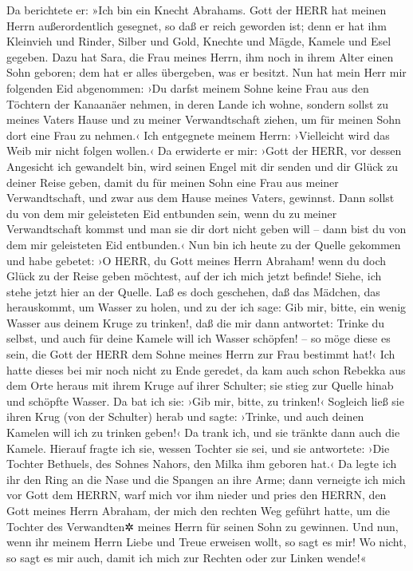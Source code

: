  Da berichtete er: »Ich bin ein Knecht Abrahams.
 Gott der HERR hat meinen Herrn außerordentlich gesegnet,
so daß er reich geworden ist; denn er hat ihm Kleinvieh und Rinder,
Silber und Gold, Knechte und Mägde, Kamele und Esel gegeben.
 Dazu hat Sara, die Frau meines Herrn, ihm noch in ihrem
Alter einen Sohn geboren; dem hat er alles übergeben, was er besitzt.
 Nun hat mein Herr mir folgenden Eid abgenommen: ›Du
darfst meinem Sohne keine Frau aus den Töchtern der Kanaanäer nehmen, in
deren Lande ich wohne,  sondern sollst zu meines Vaters
Hause und zu meiner Verwandtschaft ziehen, um für meinen Sohn dort eine
Frau zu nehmen.‹  Ich entgegnete meinem Herrn:
›Vielleicht wird das Weib mir nicht folgen wollen.‹  Da
erwiderte er mir: ›Gott der HERR, vor dessen Angesicht ich gewandelt
bin, wird seinen Engel mit dir senden und dir Glück zu deiner Reise
geben, damit du für meinen Sohn eine Frau aus meiner Verwandtschaft, und
zwar aus dem Hause meines Vaters, gewinnst.  Dann sollst
du von dem mir geleisteten Eid entbunden sein, wenn du zu meiner
Verwandtschaft kommst und man sie dir dort nicht geben will -- dann bist
du von dem mir geleisteten Eid entbunden.‹  Nun bin ich
heute zu der Quelle gekommen und habe gebetet: ›O HERR, du Gott meines
Herrn Abraham! wenn du doch Glück zu der Reise geben möchtest, auf der
ich mich jetzt befinde!  Siehe, ich stehe jetzt hier an
der Quelle. Laß es doch geschehen, daß das Mädchen, das herauskommt, um
Wasser zu holen, und zu der ich sage: Gib mir, bitte, ein wenig Wasser
aus deinem Kruge zu trinken!,  daß die mir dann
antwortet: Trinke du selbst, und auch für deine Kamele will ich Wasser
schöpfen! -- so möge diese es sein, die Gott der HERR dem Sohne meines
Herrn zur Frau bestimmt hat!‹  Ich hatte dieses bei mir
noch nicht zu Ende geredet, da kam auch schon Rebekka aus dem Orte
heraus mit ihrem Kruge auf ihrer Schulter; sie stieg zur Quelle hinab
und schöpfte Wasser. Da bat ich sie: ›Gib mir, bitte, zu trinken!‹
 Sogleich ließ sie ihren Krug (von der Schulter) herab
und sagte: ›Trinke, und auch deinen Kamelen will ich zu trinken geben!‹
Da trank ich, und sie tränkte dann auch die Kamele. 
Hierauf fragte ich sie, wessen Tochter sie sei, und sie antwortete: ›Die
Tochter Bethuels, des Sohnes Nahors, den Milka ihm geboren hat.‹ Da
legte ich ihr den Ring an die Nase und die Spangen an ihre Arme;
 dann verneigte ich mich vor Gott dem HERRN, warf mich
vor ihm nieder und pries den HERRN, den Gott meines Herrn Abraham, der
mich den rechten Weg geführt hatte, um die Tochter des Verwandten✲
meines Herrn für seinen Sohn zu gewinnen.  Und nun, wenn
ihr meinem Herrn Liebe und Treue erweisen wollt, so sagt es mir! Wo
nicht, so sagt es mir auch, damit ich mich zur Rechten oder zur Linken
wende!«

